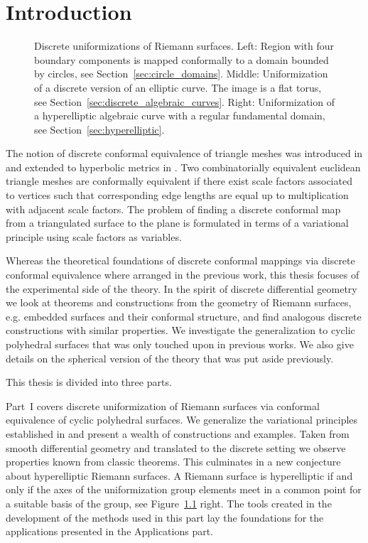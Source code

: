 \documentclass[Thesis.tex]{subfiles}
\begin{document}
\chapter{Introduction}

\begin{figure}
\centering
{}
\caption{
Discrete uniformizations of Riemann surfaces. 
Left: Region with four boundary components is mapped conformally to a domain bounded by circles, see Section~\ref{sec:circle_domains}. 
Middle: Uniformization of a discrete version of an elliptic curve. The image is a flat torus, see Section~\ref{sec:discrete_algebraic_curves}. 
Right: Uniformization of a hyperelliptic algebraic curve with a regular fundamental domain, see Section~\ref{sec:hyperelliptic}.
}
\label{fig:intro_uniformizations} 
\end{figure}

The notion of discrete conformal equivalence of triangle meshes was introduced in \cite{Springborn2008} and extended to hyperbolic metrics in \cite{Bobenko2010}. 
Two combinatorially equivalent euclidean triangle meshes are conformally equivalent if there exist scale factors associated to vertices such that corresponding edge lengths are equal up to multiplication with adjacent scale factors.
The problem of finding a discrete conformal map from a triangulated surface to the plane is formulated in terms of a variational principle using scale factors as variables.

Whereas the theoretical foundations of discrete conformal mappings via discrete conformal equivalence where arranged in the previous work, this thesis focuses of the experimental side of the theory. 
In the spirit of discrete differential geometry we look at theorems and constructions from the geometry of Riemann surfaces, e.g. embedded surfaces and their conformal structure, and find analogous discrete constructions with similar properties.
We investigate the generalization to cyclic polyhedral surfaces that was only touched upon in previous works.
We also give details on the spherical version of the theory that was put aside previously.

This thesis is divided into three parts. 

Part~I covers discrete uniformization of Riemann surfaces via conformal equivalence of cyclic polyhedral surfaces.
We generalize the variational principles established in \cite{Bobenko2010} and present a wealth of constructions and examples. 
Taken from smooth differential geometry and translated to the discrete setting we observe properties known from classic theorems. 
This culminates in a new conjecture about hyperelliptic Riemann surfaces. 
A Riemann surface is hyperelliptic if and only if the axes of the uniformization group elements meet in a common point for a suitable basis of the group, see Figure~\ref{fig:intro_uniformizations} right.
The tools created in the development of the methods used in this part lay the foundations for the applications presented in the Applications part.
\end{document}
